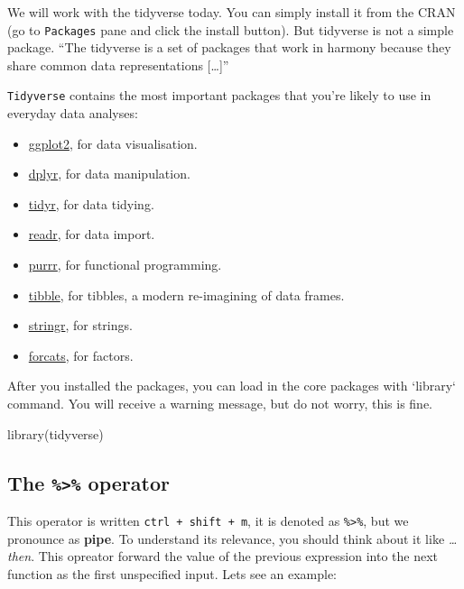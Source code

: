 \documentclass[
]{article}
\newenvironment{Shaded}{\begin{snugshade}}{\end{snugshade}}
\newcommand{\FunctionTok}[1]{\textcolor[rgb]{0.00,0.00,0.00}{#1}}
\newcommand{\NormalTok}[1]{#1}
\begin{document}
We will work with the tidyverse today. You can simply install it from the CRAN (go to \texttt{Packages} pane and click the install button). But tidyverse is not a simple package. ``The tidyverse is a set of packages that work in harmony because they share common data representations {[}\ldots{]}''

\texttt{Tidyverse} contains the most important packages that you're likely to use in everyday data analyses:

\begin{itemize}
\item
  \href{https://ggplot2.tidyverse.org/}{ggplot2}, for data visualisation.
\item
  \href{https://dplyr.tidyverse.org/}{dplyr}, for data manipulation.
\item
  \href{https://tidyr.tidyverse.org/}{tidyr}, for data tidying.
\item
  \href{https://readr.tidyverse.org/}{readr}, for data import.
\item
  \href{https://purrr.tidyverse.org/}{purrr}, for functional programming.
\item
  \href{https://tibble.tidyverse.org/}{tibble}, for tibbles, a modern re-imagining of data frames.
\item
  \href{https://github.com/tidyverse/stringr}{stringr}, for strings.
\item
  \href{https://github.com/tidyverse/forcats}{forcats}, for factors.
\end{itemize}

After you installed the packages, you can load in the core packages with `library` command. You will receive a warning message, but do not worry, this is fine.

\begin{Shaded}
\begin{Highlighting}[]
\FunctionTok{library}\NormalTok{(tidyverse)}
\end{Highlighting}
\end{Shaded}

\hypertarget{the-operator}{%
\subsection{\texorpdfstring{The \texttt{\%\textgreater{}\%} operator}{The \%\textgreater\% operator}}\label{the-operator}}

This operator is written \texttt{ctrl\ +\ shift\ +\ m}, it is denoted as \texttt{\%\textgreater{}\%}, but we pronounce as \textbf{pipe}. To understand its relevance, you should think about it like \emph{\ldots{} then}. This opreator forward the value of the previous expression into the next function as the first unspecified input. Lets see an example:
\end{document}
